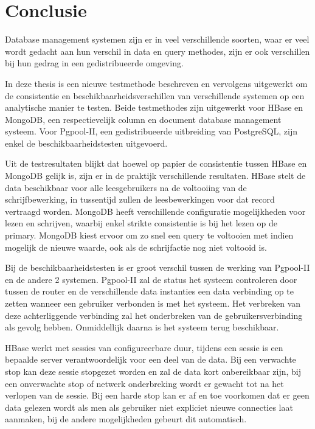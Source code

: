 \chapter{Conclusie}
Database management systemen zijn er in veel verschillende soorten, waar er veel wordt gedacht aan hun verschil in data en query methodes, zijn er ook verschillen bij hun gedrag in een gedistribueerde omgeving.

In deze thesis is een nieuwe testmethode beschreven en vervolgens uitgewerkt om de consistentie en beschikbaarheidsverschillen van verschillende systemen op een analytische manier te testen. Beide testmethodes zijn uitgewerkt voor HBase en MongoDB, een respectievelijk column en document database management systeem. Voor Pgpool-II, een gedistribueerde uitbreiding van PostgreSQL, zijn enkel de beschikbaarheidstesten uitgevoerd. 

Uit de testresultaten blijkt dat hoewel op papier de consistentie tussen HBase en MongoDB gelijk is, zijn er in de praktijk verschillende resultaten. HBase stelt de data beschikbaar voor alle leesgebruikers na de voltooiing van de schrijfbewerking, in tussentijd zullen de leesbewerkingen voor dat record vertraagd worden. MongoDB heeft verschillende configuratie mogelijkheden voor lezen en schrijven, waarbij enkel strikte consistentie is bij het lezen op de primary. MongoDB kiest ervoor om zo snel een query te voltooien met indien mogelijk de nieuwe waarde, ook als de schrijfactie nog niet voltooid is. 

Bij de beschikbaarheidstesten is er groot verschil tussen de werking van Pgpool-II en de andere 2 systemen. Pgpool-II zal de status het systeem controleren door tussen de router en de verschillende data instanties een data verbinding op te zetten wanneer een gebruiker verbonden is met het systeem. Het verbreken van deze achterliggende verbinding zal het onderbreken van de gebruikersverbinding als gevolg hebben. Onmiddellijk daarna is het systeem terug beschikbaar. 

HBase werkt met sessies van configureerbare duur, tijdens een sessie is een bepaalde server verantwoordelijk voor een deel van de data. Bij een verwachte stop kan deze sessie stopgezet worden en zal de data kort onbereikbaar zijn, bij een onverwachte stop of netwerk onderbreking wordt er gewacht tot na het verlopen van de sessie. Bij een harde stop kan er af en toe voorkomen dat er geen data gelezen wordt als men als gebruiker niet expliciet nieuwe connecties laat aanmaken, bij de andere mogelijkheden gebeurt dit automatisch. 

